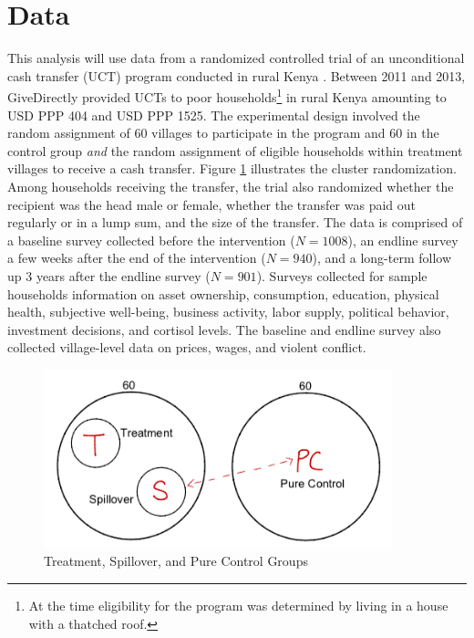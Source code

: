 \documentclass[11pt]{article}
\begin{document}
\section{Data}

    This analysis will use data from a randomized controlled trial of an unconditional cash transfer (UCT) program conducted in rural Kenya \parencite{haushofer_short-term_2016}. Between 2011 and 2013, GiveDirectly provided UCTs to poor households\footnote{At the time eligibility for the program was determined by living in a house with a thatched roof.} in rural Kenya amounting to USD PPP 404 and USD PPP 1525. The experimental design involved the random assignment of 60 villages to participate in the program and 60 in the control group \textit{and} the random assignment of eligible households within treatment villages to receive a cash transfer. Figure \ref{fig:design} illustrates the cluster randomization. Among households receiving the transfer, the trial also randomized whether the recipient was the head male or female, whether the transfer was paid out regularly or in a lump sum, and the size of the transfer. The data is comprised of a baseline survey collected before the intervention ($N=1008$), an endline survey a few weeks after the end of the intervention ($N=940$), and a long-term follow up 3 years after the endline survey ($N=901$). Surveys collected for sample households information on asset ownership, consumption, education, physical health, subjective well-being, business activity, labor supply, political behavior, investment decisions, and cortisol levels. The baseline and endline survey also collected village-level data on prices, wages, and violent conflict.

    \begin{figure}[H]
    	\centering
    	\includegraphics[width=0.9\textwidth]{../Presentation/design.png}
    	\caption{Treatment, Spillover, and Pure Control Groups}
        \label{fig:design}
    \end{figure}
\end{document}
